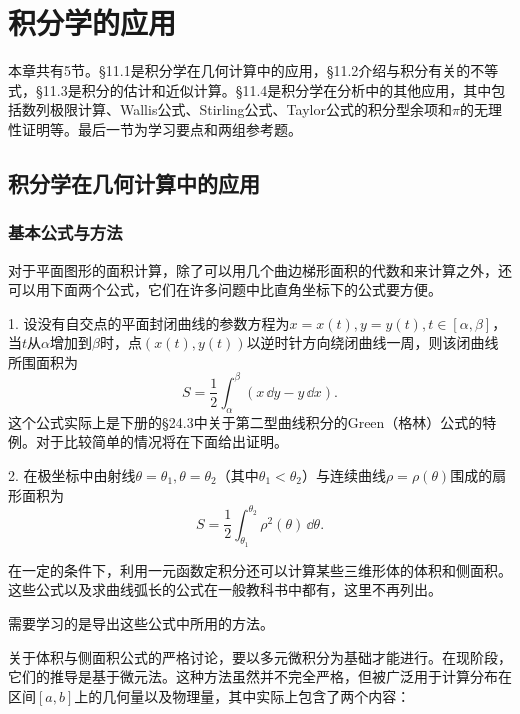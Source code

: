 \chapter{积分学的应用}


本章共有5节。§11.1是积分学在几何计算中的应用，§11.2介绍与积分有关的不等式，§11.3是积分的估计和近似计算。§11.4是积分学在分析中的其他应用，其中包括数列极限计算、Wallis公式、Stirling公式、Taylor公式的积分型余项和$\pi$的无理性证明等。最后一节为学习要点和两组参考题。

\section{积分学在几何计算中的应用}

\subsection{基本公式与方法}

对于平面图形的面积计算，除了可以用几个曲边梯形面积的代数和来计算之外，还可以用下面两个公式，它们在许多问题中比直角坐标下的公式要方便。

1. 设没有自交点的平面封闭曲线的参数方程为$x=x(t),y=y(t),t\in[\alpha,\beta]$，当$t$从$\alpha$增加到$\beta$时，点$(x(t),y(t))$以逆时针方向绕闭曲线一周，则该闭曲线所围面积为
\begin{equation}
  S=\frac12\int_\alpha^\beta (x\,\dd y-y\,\dd x).
  \tag{11.1}
  \label{eq:11.1}
\end{equation}
这个公式实际上是下册的§24.3中关于第二型曲线积分的Green（格林）公式的特例。对于比较简单的情况将在下面给出证明。

2. 在极坐标中由射线$\theta=\theta_1,\theta=\theta_2$（其中$\theta_1<\theta_2$）与连续曲线$\rho=\rho(\theta)$围成的扇形面积为
\begin{equation}
  S=\frac12\int_{\theta_1}^{\theta_2}\rho^2(\theta)\,\dd\theta.
  \tag{11.2}
  \label{eq:11.2}
\end{equation}

在一定的条件下，利用一元函数定积分还可以计算某些三维形体的体积和侧面积。这些公式以及求曲线弧长的公式在一般教科书中都有，这里不再列出。

需要学习的是导出这些公式中所用的方法。

关于体积与侧面积公式的严格讨论，要以多元微积分为基础才能进行。在现阶段，它们的推导是基于微元法。这种方法虽然并不完全严格，但被广泛用于计算分布在区间$[a,b]$上的几何量以及物理量，其中实际上包含了两个内容：

